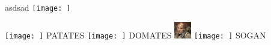 \documentclass{exam}
\begin{document}
\begin{questions}
\question asdsad\newline
\texttt{[image: ]} \newline
\begin{oneparchoices}
\choice \texttt{[image: ]}
PATATES
\choice \texttt{[image: ]}
DOMATES
\choice \includegraphics[height=2em]{216.jpg}
\choice \texttt{[image: ]}
SOGAN
\end{oneparchoices}
\end{questions}
\end{document}
